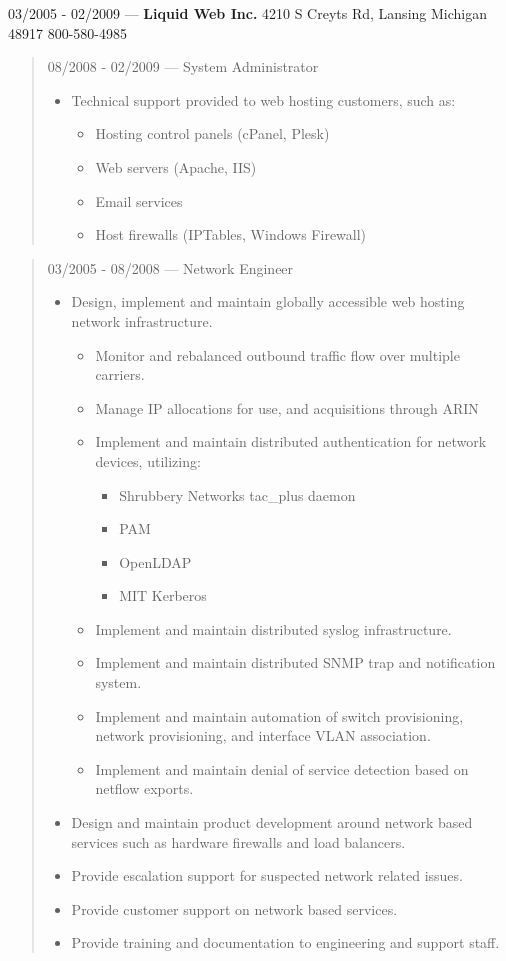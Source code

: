 03/2005 - 02/2009 --- {\bf Liquid Web Inc.} 4210 S Creyts Rd, Lansing Michigan 48917 800-580-4985
\begin{quote}
08/2008 - 02/2009 --- System Administrator\\
\begin{itemize}
\item Technical support provided to web hosting customers, such as:
\begin{itemize}
\item Hosting control panels (cPanel, Plesk)
\item Web servers (Apache, IIS)
\item Email services
\item Host firewalls (IPTables, Windows Firewall)
\end{itemize}
\end{itemize}
\end{quote}
\begin{quote}
03/2005 - 08/2008 --- Network Engineer\\
\begin{itemize}
\item Design, implement and maintain globally accessible web hosting
network infrastructure.
\begin{itemize}
\item Monitor and rebalanced outbound traffic flow over multiple
carriers.
\item Manage IP allocations for use, and acquisitions through ARIN
\item Implement and maintain distributed authentication for network
devices, utilizing:
\begin{itemize}
\item Shrubbery Networks tac\_plus daemon
\item PAM
\item OpenLDAP
\item MIT Kerberos
\end{itemize}
\item Implement and maintain distributed syslog infrastructure.
\item Implement and maintain distributed SNMP trap and notification
system.
\item Implement and maintain automation of switch provisioning, network
provisioning, and interface VLAN association.
\item Implement and maintain denial of service detection based on netflow
exports.
\end{itemize}
\item Design and maintain product development around network based services
such as hardware firewalls and load balancers.
\item Provide escalation support for suspected network related issues.
\item Provide customer support on network based services.
\item Provide training and documentation to engineering and support staff.
\end{itemize}
\end{quote}
